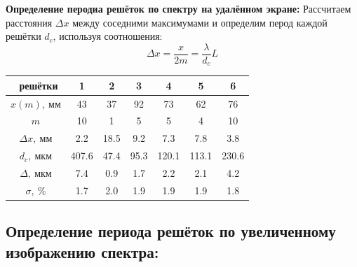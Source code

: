 \documentclass[a4paper, 12pt]{article}%
\begin{document}
\textbf{Определение перодиа решёток по спектру на удалённом экране:}
Рассчитаем расстояния $\Delta x$ между соседними максимумами и определим перод каждой решётки $d_c$, используя соотношения:
\[
\Delta x = \frac{x}{2 m} = \frac{\lambda}{d_c} L
\]
\begin{table}[H]
	\centering
	\begin{tabular}{|c|c|c|c|c|c|c|}  \hline
	\textnumero\ решётки & 1 & 2 & 3 & 4 & 5 & 6 \\\hline
	$x(m),\ мм$ & 43 & 37 & 92 & 73 & 62 & 76 \\\hline
	$m$ & 10 & 1 & 5 & 5 & 4 & 10 \\\hline
	$\Delta x,\ мм$ & 2.2 & 18.5 & 9.2 & 7.3 & 7.8 & 3.8 \\\hline
	$d_c,\ мкм$ & 407.6 & 47.4 & 95.3 & 120.1 & 113.1 & 230.6 \\\hline
	$\Delta,\ мкм$ & 7.4 & 0.9 & 1.7 & 2.2 & 2.1 & 4.2 \\\hline
	$\sigma,\ \%$ & 1.7 & 2.0 & 1.9 & 1.9 & 1.9 & 1.8 \\\hline
	\end{tabular}
	\end{table}
\subsection{Определение периода решёток по увеличенному изображению спектра:}
\end{document}
